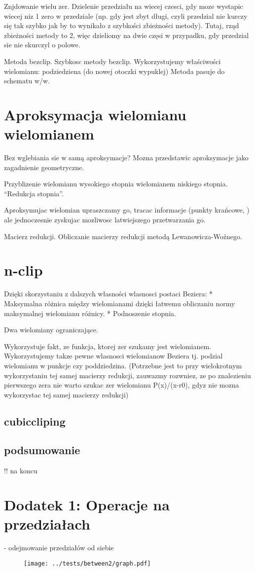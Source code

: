 \documentclass[11pt,a4paper,oneside]{report}
\begin{document}
Znjdowanie wielu zer. Dzielenie przedziału na wiecej czesci, gdy moze wystapic wiecej niz 1 zero w przedziale (np. gdy jest zbyt długi, czyli przedzial nie kurczy się tak szybko jak by to wynikało z szybkości zbieżności metody). Tutaj, rząd zbieżności metody to 2, więc dzieliomy na dwie częsi w przypadku, gdy przedzial sie nie skurczyl o polowe.

Metoda bezclip. Szybkosc metody bezclip.
Wykorzystujemy właściwości wielomianu: podziedziena (do nowej otoczki wypuklej)
Metoda pasuje do schematu w/w.

\section{Aproksymacja wielomianu wielomianem}

Bez wglebiania sie w samą aproksymacje? Mozna przedstawic aproksymacje jako zagadnienie geometryczne.

Przyblizenie wielomianu wysokiego stopnia wielomianem niskiego stopnia. ``Redukcja stopnia''. 

Aproksymujac wielomian upraszczamy go, tracac informacje (punkty krańcowe, ) ale jednoczesnie zyskujac mozliwosc latwiejszego przetwarzania go.

Macierz redukcji. Obliczanie macierzy redukcji metodą Lewanowicza-Woźnego.

\section{n-clip}

Dzięki skorzystaniu z dalszych własności wlasnosci postaci Beziera: 
* Maksymalna różnica między wielomianami dzięki łatwemu obliczaniu normy maksymalnej wielomianu różnicy.
* Podnoszenie stopnia.

Dwa wielomiany ograniczające.

Wykorzystuje fakt, ze funkcja, ktorej zer szukamy jest wielomianem. Wykorzystujemy takze pewne wlasnosci wielomianow Beziera tj. podzial wielomianu w punkcje czy poddziedzina. (Potrzebne jest to przy wielokrotnym wykorzystaniu tej samej macierzy redukcji, zauwazmy rozwniez, ze po znalezieniu pierwszego zera nie warto szukac zer wielomianu P(x)/(x-r0), gdyz nie mozna wykorzystac tej samej macierzy redukcji)

\subsection{cubiccliping}

\subsection{podsumowanie}

!! na koncu

\section{Dodatek 1: Operacje na przedziałach}

- odejmowanie przedziałów od siebie



\begin{center}
\begin{figure}
\texttt{[image: ../tests/between2/graph.pdf]}
\end{figure}
\end{center}
\end{document}
